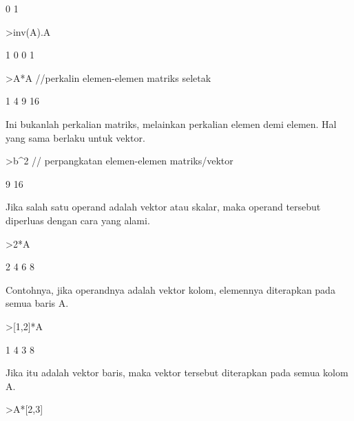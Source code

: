 \documentclass[12pt,arial,letterpaper]{book}
\begin{document}
\begin{eulercomment}
\begin{eulercomment}
\begin{euleroutput}
              0             1 
\end{euleroutput}
\begin{eulerprompt}
>inv(A).A
\end{eulerprompt}
\begin{euleroutput}
              1             0 
              0             1 
\end{euleroutput}
\begin{eulerprompt}
>A*A //perkalin elemen-elemen matriks seletak
\end{eulerprompt}
\begin{euleroutput}
              1             4 
              9            16 
\end{euleroutput}
\begin{eulercomment}
Ini bukanlah perkalian matriks, melainkan perkalian elemen demi
elemen. Hal yang sama berlaku untuk vektor.
\end{eulercomment}
\begin{eulerprompt}
>b^2 // perpangkatan elemen-elemen matriks/vektor
\end{eulerprompt}
\begin{euleroutput}
              9 
             16 
\end{euleroutput}
\begin{eulercomment}
Jika salah satu operand adalah vektor atau skalar, maka operand
tersebut diperluas dengan cara yang alami.
\end{eulercomment}
\begin{eulerprompt}
>2*A
\end{eulerprompt}
\begin{euleroutput}
              2             4 
              6             8 
\end{euleroutput}
\begin{eulercomment}
Contohnya, jika operandnya adalah vektor kolom, elemennya diterapkan
pada semua baris A.
\end{eulercomment}
\begin{eulerprompt}
>[1,2]*A
\end{eulerprompt}
\begin{euleroutput}
              1             4 
              3             8 
\end{euleroutput}
\begin{eulercomment}
Jika itu adalah vektor baris, maka vektor tersebut diterapkan pada
semua kolom A.
\end{eulercomment}
\begin{eulerprompt}
>A*[2,3]

\end{eulerprompt}
\end{eulercomment}
\end{eulercomment}
\end{document}
